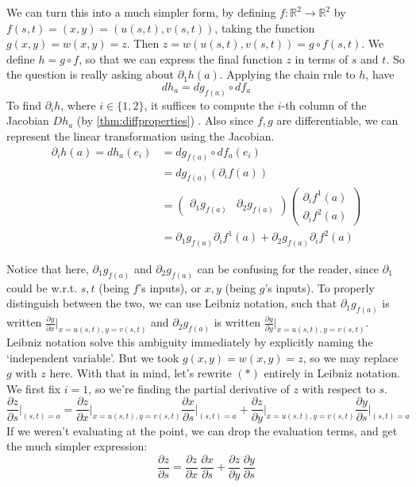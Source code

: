 \noindent We can turn this into a much simpler form, by defining $f : \mathbb{R}^2 \to \mathbb{R}^2$ by $f(s, t) = (x, y) = (u(s, t), v(s, t))$, taking the function $g(x, y) = w(x, y) = z$. Then $z = w(u(s, t), v(s, t)) =  g \circ f (s, t)$. We define $h = g \circ f$, so that we can express the final function $z$ in terms of $s$ and $t$. So the question is really asking about $\partial_1 h(a)$. Applying the chain rule to $h$, have
\[
dh_a = dg_{f(a)} \circ df_{a}
\]
To find $\partial_i h$, where $i \in \{ 1, 2 \}$, it suffices to compute the $i$-th column of the Jacobian $Dh_a$ (by \ref{thm:diffproperties}) . Also since $f, g$ are differentiable, we can represent the linear transformation using the Jacobian. 
\begin{align*}
    \partial_i h(a) = dh_a(e_i) &= dg_{f(a)} \circ df_{a}(e_i) \\
 &= dg_{f(a)}(\partial_i f(a)) \\
 &= \begin{pmatrix}
 \partial_1 g_{f(a)} & \partial_2 g_{f(a)}
 \end{pmatrix}
 \begin{pmatrix}
 \partial_i f^1(a) \\ \partial_i f^2(a)
 \end{pmatrix} \\
    &= \partial_1 g_{f(a)} \partial_i f^1(a) + \partial_2 g_{f(a)} \partial_i f^2(a) \tag{$*$}
\end{align*}

\noindent Notice that here, $\partial_1 g_{f(a)}$ and $\partial_2 g_{f(a)}$ can be confusing for the reader, since $\partial_1$ could be w.r.t. $s, t$ (being $f$'s inputs), or $x, y$ (being $g$'s inputs). To properly distinguish between the two, we can use Leibniz notation, such that $\partial_1 g_{f(a)}$ is written $\displaystyle \frac{\partial g}{\partial x} \big|_{x=u(s, t), y=v(s, t)}$ and $\partial_2 g_{f(a)}$ is written $\displaystyle \frac{\partial g}{\partial y} \big|_{x=u(s, t), y=v(s, t)}$. Leibniz notation solve this ambiguity immediately by explicitly naming the `independent variable'. But we took $g(x, y) = w(x, y) = z$, so we may replace $g$ with $z$ here. With that in mind, let's rewrite $(*)$ entirely in Leibniz notation. We first fix $i = 1$, so we're finding the partial derivative of $z$ with respect to $s$.
\[
\frac{\partial z}{\partial s}\bigg|_{(s, t) = a} = \frac{\partial z}{\partial x} \bigg|_{x=u(s, t), y=v(s, t)} \frac{\partial x}{\partial s}\bigg|_{(s, t) = a} + \frac{\partial z}{\partial y} \bigg|_{x=u(s, t), y=v(s, t)} \frac{\partial y}{\partial s}\big|_{(s, t) = a} 
\]
If we weren't evaluating at the point, we can drop the evaluation terms, and get the much simpler expression:
\[
\frac{\partial z}{\partial s} = \frac{\partial z}{\partial x} \,  \frac{\partial x}{\partial s} + \frac{\partial z}{\partial y} \, \frac{\partial y}{\partial s}
\]


